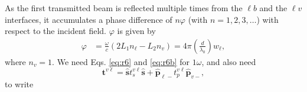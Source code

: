\documentclass[aps,pra,10pt,amsmath,twocolumn,letterpaper]{revtex4-1}
\begin{document}
As the first transmitted beam is reflected multiple times from the $\ell b$ and
the $\ell v$ interfaces, it accumulates a phase difference of $n\varphi$ (with
$n=1,2,3,\ldots$) with respect to the incident field. $\varphi$ is given by
\begin{equation}\label{mphi}
\begin{split}
\varphi &= \frac{\omega}{c}(2L_{1}n_{\ell} - L_{2}n_{v}) 
= 4\pi\left(\frac{d}{\lambda_{0}}\right)w_{\ell},
\end{split}
\end{equation}
where $n_{v} = 1$. We need Eqs. \eqref{eq:r6} and \eqref{eq:r6b} for $1\omega$,
and also need
\begin{equation*}\label{eq:mvv}
\mathbf{t}^{v\ell}
= \hat{\mathbf{s}}t_{s}^{v\ell}\hat{\mathbf{s}} 
+ \hat{\mathbf{p}}_{\ell -}t_{p}^{v\ell}\hat{\mathbf{p}}_{v-},
\end{equation*}
to write
\end{document}
